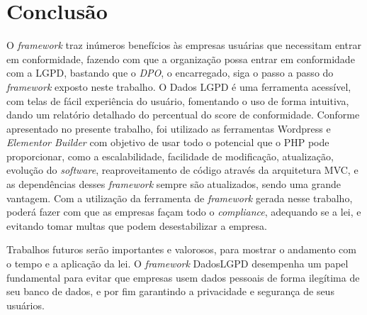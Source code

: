 \documentclass[
	12pt,				%
	openright,			%
	oneside,			%
	a4paper,			%
	english,			%
	french,				%
	spanish,			%
	brazil,				%
	]{abntex2}
\begin{document}
 \chapter{Conclusão}
 \label{ch: conclusao}
 O \textit{framework} traz inúmeros benefícios às empresas usuárias que necessitam entrar em conformidade, fazendo com que a organização possa entrar em conformidade com a LGPD, bastando que o \textit{DPO}, o encarregado, siga o passo a passo do \textit{framework} exposto neste trabalho. O Dados LGPD é uma ferramenta acessível, com telas de fácil experiência do usuário, fomentando o uso de forma intuitiva, dando um relatório detalhado do percentual do score de conformidade. Conforme apresentado no presente trabalho, foi utilizado as ferramentas Wordpress e \textit{Elementor Builder} com objetivo de usar todo o potencial que o PHP pode proporcionar, como a escalabilidade, facilidade de modificação, atualização, evolução do \textit{software}, reaproveitamento de código através da arquitetura MVC, e as dependências desses \textit{framework} sempre são atualizados, sendo uma grande vantagem. Com a utilização da ferramenta de \textit{framework} gerada nesse trabalho, poderá fazer com que as empresas façam todo o \textit{compliance}, adequando se a lei, e evitando tomar multas que podem desestabilizar a empresa.

Trabalhos futuros serão importantes e valorosos, para mostrar o andamento com o tempo e a aplicação da lei. O \textit{\textit{framework} } DadosLGPD desempenha um papel fundamental para evitar que empresas usem dados pessoais de forma ilegítima de seu banco de dados, e por fim garantindo a privacidade e segurança de seus usuários.




% 

\postextual
\end{document}
